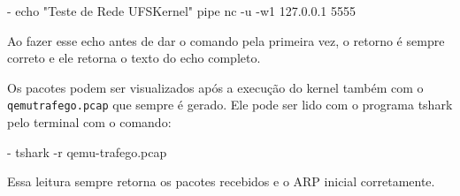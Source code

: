- echo "Teste de Rede UFSKernel" {pipe} nc -u -w1 127.0.0.1 5555

Ao fazer esse echo antes de dar o comando pela primeira vez, o retorno é sempre correto e ele retorna o texto do echo completo.

Os pacotes podem ser visualizados após a execução do kernel também com o \texttt{qemu\-trafego.pcap} que sempre é gerado. Ele pode ser lido com o programa tshark pelo terminal com o comando:

- tshark -r qemu-trafego.pcap 

Essa leitura sempre retorna os pacotes recebidos e o ARP inicial corretamente.




